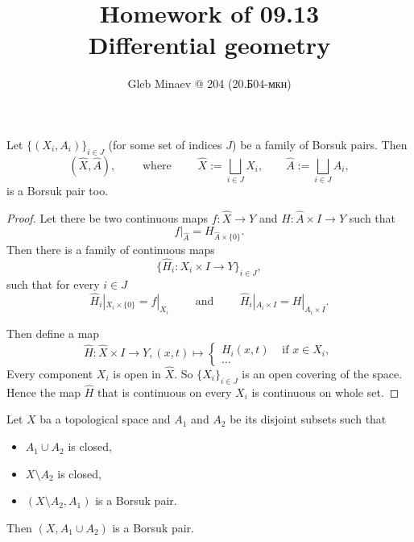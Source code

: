 \documentclass[12pt,a4paper]{article}
\title{Homework of 09.13\\Differential geometry}
\author{Gleb Minaev @ 204 (20.Б04-мкн)}
\date{}
\begin{document}
    \maketitle

    \begin{problem}{21}
        \begin{lemma}
            Let $\{(X_i, A_i)\}_{i \in J}$ (for some set of indices $J$) be a family of Borsuk pairs. Then
            \[
                (\widehat{X}, \widehat{A}),
                \qquad \text{ where } \qquad
                \widehat{X} := \bigsqcup_{i \in J} X_i,
                \qquad
                \widehat{A} := \bigsqcup_{i \in J} A_i,
            \]
            is a Borsuk pair too.
        \end{lemma}

        \begin{proof}
            Let there be two continuous maps $f: \widehat{X} \to Y$ and $H: \widehat{A} \times I \to Y$ such that
            \[f|_{\widehat{A}} = H_{\widehat{A} \times \{0\}}.\]
            Then there is a family of continuous maps
            \[\{\widehat{H}_i: X_i \times I \to Y\}_{i \in J},\]
            such that for every $i \in J$
            \[
                \widehat{H}_i|_{X_i \times \{0\}} = f|_{X_i}
                \qquad \text{ and } \qquad
                \widehat{H}_i|_{A_i \times I} = H|_{A_i \times I}.
            \]

            Then define a map
            \[
                \widehat{H}: \widehat{X} \times I \to Y, (x, t) \mapsto
                \begin{cases}
                    H_i(x, t)& \text{ if } x \in X_i,\\
                    \dots
                \end{cases}
            \]
            Every component $X_i$ is open in $\widehat{X}$. So $\{X_i\}_{i \in J}$ is an open covering of the space. Hence the map $\widehat{H}$ that is continuous on every $X_i$ is continuous on whole set.
        \end{proof}

        \begin{lemma}\label{Borsuk-pair-with-other-set-lemma}
            Let $X$ ba a topological space and $A_1$ and $A_2$ be its disjoint subsets such that
            \begin{itemize}
                \item $A_1 \cup A_2$ is closed,
                \item $X \setminus A_2$ is closed,
                \item $(X \setminus A_2, A_1)$ is a Borsuk pair.
            \end{itemize}
            Then $(X, A_1 \cup A_2)$ is a Borsuk pair.
        \end{lemma}


\end{problem}
\end{document}

